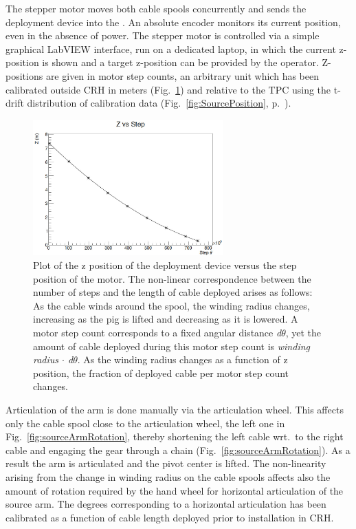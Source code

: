 The stepper motor moves both cable spools concurrently and sends the deployment device into the \lsv. An absolute encoder monitors its current position, even in the absence of power. The stepper motor is controlled via a simple graphical LabVIEW interface, run on a dedicated laptop, in which the current z-position is shown and a target z-position can be provided by the operator. Z-positions are given in motor step counts, an arbitrary unit which has been calibrated outside CRH in meters (Fig.~\ref{fig:z_test}) and relative to the TPC using the t-drift distribution of calibration data (Fig.~\ref{fig:SourcePosition}, p.~\pageref{fig:SourcePosition}).

\begin{figure}[htbp]
 \centering
 \includegraphics[width=0.65\textwidth]{Figures/Z_positioning_test}
 \caption{Plot of the z position of the deployment device versus the step position of the motor. The non-linear correspondence between the number of steps and the length of cable deployed arises as follows: As the cable winds around the spool, the winding radius changes, increasing as the pig is lifted and decreasing as it is lowered. A motor step count corresponds to a fixed angular distance \textit{d$\theta$}, yet the amount of cable deployed during this motor step count is \textit{winding radius $\cdot$ d$\theta$}. As the winding radius changes as a function of z position, the fraction of deployed cable per motor step count changes.}
 \label{fig:z_test}
\end{figure}

Articulation of the arm is done manually via the articulation wheel. This affects only the cable spool close to the articulation wheel, the left one in Fig.~\ref{fig:sourceArmRotation}, thereby shortening the left cable wrt.~to the right cable and engaging the gear through a chain (Fig.~\ref{fig:sourceArmRotation}). As a result the arm is articulated and the pivot center is lifted. The non-linearity arising from the change in winding radius on the cable spools affects also the amount of rotation required by the hand wheel for horizontal articulation of the source arm.
The degrees corresponding to a horizontal articulation has been calibrated as a function of cable length deployed prior to installation in CRH.

